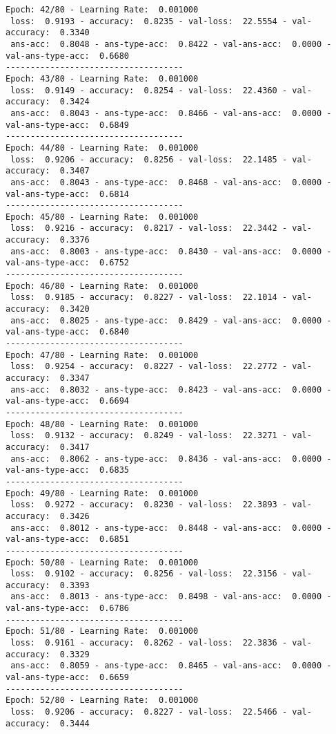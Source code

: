 \documentclass{report}
\begin{document}
\begin{verbatim}
Epoch: 42/80 - Learning Rate:  0.001000
 loss:  0.9193 - accuracy:  0.8235 - val-loss:  22.5554 - val-accuracy:  0.3340
 ans-acc:  0.8048 - ans-type-acc:  0.8422 - val-ans-acc:  0.0000 - val-ans-type-acc:  0.6680
------------------------------------
Epoch: 43/80 - Learning Rate:  0.001000
 loss:  0.9149 - accuracy:  0.8254 - val-loss:  22.4360 - val-accuracy:  0.3424
 ans-acc:  0.8043 - ans-type-acc:  0.8466 - val-ans-acc:  0.0000 - val-ans-type-acc:  0.6849
------------------------------------
Epoch: 44/80 - Learning Rate:  0.001000
 loss:  0.9206 - accuracy:  0.8256 - val-loss:  22.1485 - val-accuracy:  0.3407
 ans-acc:  0.8043 - ans-type-acc:  0.8468 - val-ans-acc:  0.0000 - val-ans-type-acc:  0.6814
------------------------------------
Epoch: 45/80 - Learning Rate:  0.001000
 loss:  0.9216 - accuracy:  0.8217 - val-loss:  22.3442 - val-accuracy:  0.3376
 ans-acc:  0.8003 - ans-type-acc:  0.8430 - val-ans-acc:  0.0000 - val-ans-type-acc:  0.6752
------------------------------------
Epoch: 46/80 - Learning Rate:  0.001000
 loss:  0.9185 - accuracy:  0.8227 - val-loss:  22.1014 - val-accuracy:  0.3420
 ans-acc:  0.8025 - ans-type-acc:  0.8429 - val-ans-acc:  0.0000 - val-ans-type-acc:  0.6840
------------------------------------
Epoch: 47/80 - Learning Rate:  0.001000
 loss:  0.9254 - accuracy:  0.8227 - val-loss:  22.2772 - val-accuracy:  0.3347
 ans-acc:  0.8032 - ans-type-acc:  0.8423 - val-ans-acc:  0.0000 - val-ans-type-acc:  0.6694
------------------------------------
Epoch: 48/80 - Learning Rate:  0.001000
 loss:  0.9132 - accuracy:  0.8249 - val-loss:  22.3271 - val-accuracy:  0.3417
 ans-acc:  0.8062 - ans-type-acc:  0.8436 - val-ans-acc:  0.0000 - val-ans-type-acc:  0.6835
------------------------------------
Epoch: 49/80 - Learning Rate:  0.001000
 loss:  0.9272 - accuracy:  0.8230 - val-loss:  22.3893 - val-accuracy:  0.3426
 ans-acc:  0.8012 - ans-type-acc:  0.8448 - val-ans-acc:  0.0000 - val-ans-type-acc:  0.6851
------------------------------------
Epoch: 50/80 - Learning Rate:  0.001000
 loss:  0.9102 - accuracy:  0.8256 - val-loss:  22.3156 - val-accuracy:  0.3393
 ans-acc:  0.8013 - ans-type-acc:  0.8498 - val-ans-acc:  0.0000 - val-ans-type-acc:  0.6786
------------------------------------
Epoch: 51/80 - Learning Rate:  0.001000
 loss:  0.9161 - accuracy:  0.8262 - val-loss:  22.3836 - val-accuracy:  0.3329
 ans-acc:  0.8059 - ans-type-acc:  0.8465 - val-ans-acc:  0.0000 - val-ans-type-acc:  0.6659
------------------------------------
Epoch: 52/80 - Learning Rate:  0.001000
 loss:  0.9206 - accuracy:  0.8227 - val-loss:  22.5466 - val-accuracy:  0.3444

\end{verbatim}
\end{document}
